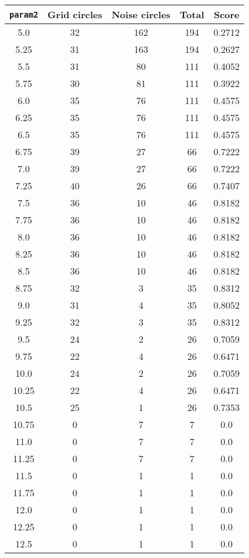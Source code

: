 \documentclass[letterpaper, 12pt]{article}
\begin{document}
\begin{longtable}{|c|c|c|c|c|}
\hline
\textbf{\texttt{param2}} & \textbf{Grid circles} & \textbf{Noise circles} & \textbf{Total} & \textbf{Score} \\
\hline
5.0 & 32 & 162 & 194 & 0.2712 \\
\hline
5.25 & 31 & 163 & 194 & 0.2627 \\
\hline
5.5 & 31 & 80 & 111 & 0.4052 \\
\hline
5.75 & 30 & 81 & 111 & 0.3922 \\
\hline
6.0 & 35 & 76 & 111 & 0.4575 \\
\hline
6.25 & 35 & 76 & 111 & 0.4575 \\
\hline
6.5 & 35 & 76 & 111 & 0.4575 \\
\hline
6.75 & 39 & 27 & 66 & 0.7222 \\
\hline
7.0 & 39 & 27 & 66 & 0.7222 \\
\hline
7.25 & 40 & 26 & 66 & 0.7407 \\
\hline
7.5 & 36 & 10 & 46 & 0.8182 \\
\hline
7.75 & 36 & 10 & 46 & 0.8182 \\
\hline
8.0 & 36 & 10 & 46 & 0.8182 \\
\hline
8.25 & 36 & 10 & 46 & 0.8182 \\
\hline
8.5 & 36 & 10 & 46 & 0.8182 \\
\hline
8.75 & 32 & 3 & 35 & 0.8312 \\
\hline
9.0 & 31 & 4 & 35 & 0.8052 \\
\hline
9.25 & 32 & 3 & 35 & 0.8312 \\
\hline
9.5 & 24 & 2 & 26 & 0.7059 \\
\hline
9.75 & 22 & 4 & 26 & 0.6471 \\
\hline
10.0 & 24 & 2 & 26 & 0.7059 \\
\hline
10.25 & 22 & 4 & 26 & 0.6471 \\
\hline
10.5 & 25 & 1 & 26 & 0.7353 \\
\hline
10.75 & 0 & 7 & 7 & 0.0 \\
\hline
11.0 & 0 & 7 & 7 & 0.0 \\
\hline
11.25 & 0 & 7 & 7 & 0.0 \\
\hline
11.5 & 0 & 1 & 1 & 0.0 \\
\hline
11.75 & 0 & 1 & 1 & 0.0 \\
\hline
12.0 & 0 & 1 & 1 & 0.0 \\
\hline
12.25 & 0 & 1 & 1 & 0.0 \\
\hline
12.5 & 0 & 1 & 1 & 0.0 \\

\end{longtable}
\end{document}
